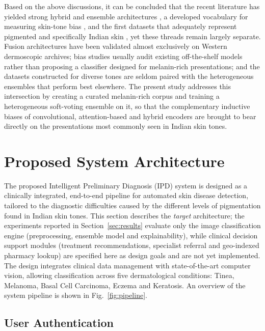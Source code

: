 \documentclass[pdflatex,sn-mathphys-num]{sn-jnl}%
\begin{document}
Based on the above discussions, it can be concluded that the recent literature has yielded
strong hybrid and ensemble architectures \cite{ref12,ref13,ref14,ref15,ref16,ref17}, a
developed vocabulary for measuring skin-tone bias \cite{ref6,ref7,ref8,ref9,ref10}, and the
first datasets that adequately represent pigmented and specifically Indian skin
\cite{ref4,ref5}, yet these threads remain largely separate. Fusion architectures have been
validated almost exclusively on Western dermoscopic archives; bias studies usually audit
existing off-the-shelf models rather than proposing a classifier designed for melanin-rich
presentations; and the datasets constructed for diverse tones are seldom paired with the
heterogeneous ensembles that perform best elsewhere. The present study addresses this
intersection by creating a curated melanin-rich corpus and training a heterogeneous
soft-voting ensemble on it, so that the complementary inductive biases of convolutional,
attention-based and hybrid encoders are brought to bear directly on the presentations most
commonly seen in Indian skin tones.

\section{Proposed System Architecture}\label{sec:sysarch}

The proposed Intelligent Preliminary Diagnosis (IPD) system is designed as a clinically
integrated, end-to-end pipeline for automated skin disease detection, tailored to the
diagnostic difficulties caused by the different levels of pigmentation found in Indian skin
tones. This section describes the \emph{target} architecture; the experiments reported in
Section~\ref{sec:results} evaluate only the image classification engine (preprocessing,
ensemble model and explainability), while clinical decision support modules (treatment
recommendations, specialist referral and geo-indexed pharmacy lookup) are specified here as
design goals and are not yet implemented. The design integrates clinical data management with
state-of-the-art computer vision, allowing classification across five dermatological
conditions: Tinea, Melanoma, Basal Cell Carcinoma, Eczema and Keratosis. An overview of the
system pipeline is shown in Fig.~\ref{fig:pipeline}.

\subsection{User Authentication}
\end{document}
